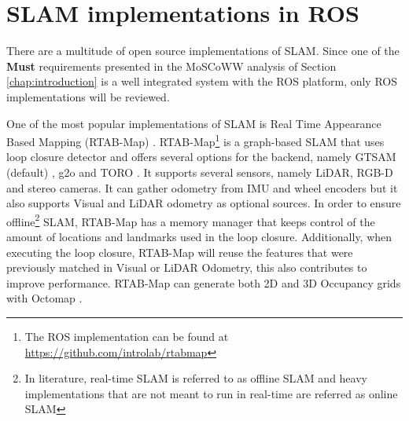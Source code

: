 \section{\acs*{SLAM} implementations in \acs*{ROS}}

There are a multitude of open source implementations of \acs*{SLAM}. Since one of the \textbf{Must} requirements presented in the MoSCoWW analysis of Section \ref*{chap:introduction} is a well integrated system with the \acs*{ROS} platform, only \acs*{ROS} implementations will be reviewed. 

One of the most popular implementations of \acs*{SLAM} is Real Time Appearance Based Mapping (RTAB-Map) \cite{labbe_rtab-map_2019}. RTAB-Map\footnote{The \acs*{ROS} implementation can be found at \url{https://github.com/introlab/rtabmap}} is a graph-based \acs*{SLAM} that uses loop closure detector and offers several options for the backend, namely GTSAM (default) \cite{gtsam}, g2o \cite{kummerle_g2o_2011} and TORO \cite{grisetti_nonlinear_2009}. It supports several sensors, namely \acs*{LiDAR}, RGB-D and stereo cameras. It can gather odometry from \acs*{IMU} and wheel encoders but it also supports Visual and \acs*{LiDAR} odometry as optional sources. In order to ensure offline\footnote{In literature, real-time \acs*{SLAM} is referred to as offline \acs*{SLAM} and heavy implementations that are not meant to run in real-time are referred as online \acs*{SLAM}} \acs*{SLAM}, RTAB-Map has a memory manager that keeps control of the amount of locations and landmarks used in the loop closure. Additionally, when executing the loop closure, RTAB-Map will reuse the features that were previously matched in Visual or \acs*{LiDAR} Odometry, this also contributes to improve performance. RTAB-Map can generate both 2D and 3D Occupancy grids with Octomap \cite{hornung_octomap_2013}.

